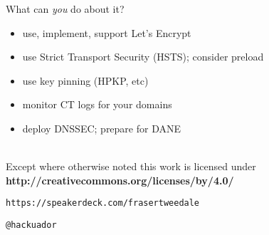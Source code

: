 \documentclass[ignorenonframetext,aspectratio=169]{beamer}
\begin{document}
\begin{frame}{What can \emph{you} do about it?}

\begin{itemize}
\item
  use, implement, support Let's Encrypt
\item
  use Strict Transport Security (HSTS); consider preload
\item
  use key pinning (HPKP, etc)
\item
  monitor CT logs for your domains
\item
  deploy DNSSEC; prepare for DANE
\end{itemize}

\end{frame}

\begin{frame}[plain]




    \setlength{\parskip}{.5em}

    { \centering

    
    \\
    { \scriptsize
    Except where otherwise noted this work is licensed under
    }\\
    { \footnotesize
    \textbf{http://creativecommons.org/licenses/by/4.0/}
    }

    \bigskip
    \Large

    \texttt{https://speakerdeck.com/frasertweedale}

    \texttt{@hackuador}

    }


\end{frame}
\end{document}
